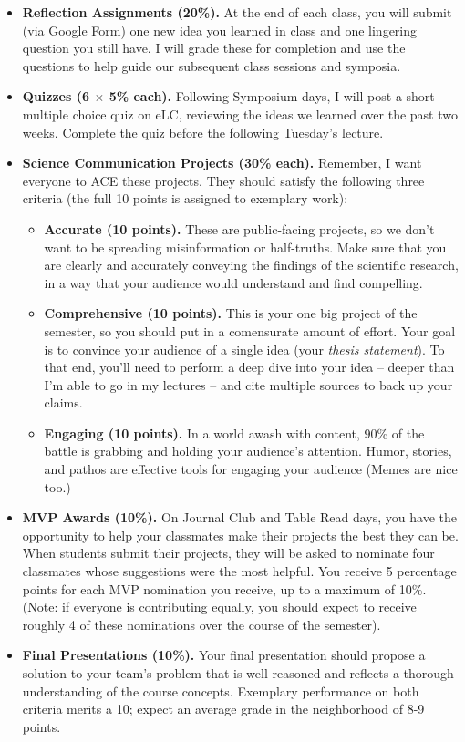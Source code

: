 \documentclass[11pt, letterpaper]{article}
\begin{document}
\begin{itemize}
	\item \textbf{Reflection Assignments (20\%).} At the end of each class, you will submit (via Google Form) one new idea you learned in class and one lingering question you still have. I will grade these for completion and use the questions to help guide our subsequent class sessions and symposia.
	\item \textbf{Quizzes (6 $\times$ 5\% each).} Following Symposium days, I will post a short multiple choice quiz on eLC, reviewing the ideas we learned over the past two weeks. Complete the quiz before the following Tuesday's lecture.
	\item \textbf{Science Communication Projects (30\% each).} Remember, I want everyone to ACE these projects. They should satisfy the following three criteria (the full 10 points is assigned to exemplary work):
		\begin{itemize}
			\item \textbf{Accurate (10 points).} These are public-facing projects, so we don't want to be spreading misinformation or half-truths. Make sure that you are clearly and accurately conveying the findings of the scientific research, in a way that your audience would understand and find compelling.
			\item \textbf{Comprehensive (10 points).} This is your one big project of the semester, so you should put in a comensurate amount of effort. Your goal is to convince your audience of a single idea (your \textit{thesis statement}). To that end, you'll need to perform a deep dive into your idea -- deeper than I'm able to go in my lectures -- and cite multiple sources to back up your claims. 
			\item \textbf{Engaging (10 points).} In a world awash with content, 90\% of the battle is grabbing and holding your audience's attention. Humor, stories, and pathos are effective tools for engaging your audience (Memes are nice too.)
		\end{itemize}
	\item \textbf{MVP Awards (10\%).} On Journal Club and Table Read days, you have the opportunity to help your classmates make their projects the best they can be. When students submit their projects, they will be asked to nominate four classmates whose suggestions were the most helpful. You receive 5 percentage points for each MVP nomination you receive, up to a maximum of 10\%. (Note: if everyone is contributing equally, you should expect to receive roughly 4 of these nominations over the course of the semester).
	\item \textbf{Final Presentations (10\%).} Your final presentation should propose a solution to your team's problem that is well-reasoned and reflects a thorough understanding of the course concepts. Exemplary performance on both criteria merits a 10; expect an average grade in the neighborhood of 8-9 points.
\end{itemize}
\end{document}
